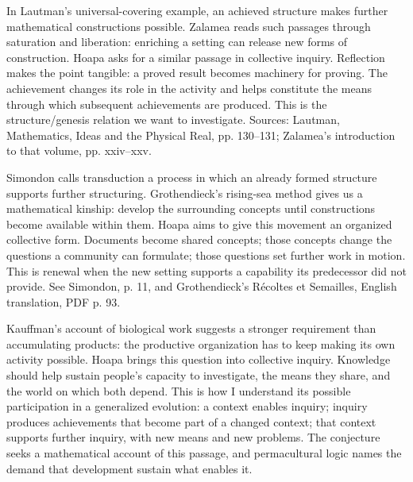\documentclass[a4paper,14pt]{extarticle}
\newcommand{\guidegroup}[1]{\par\addvspace{10pt}\needspace{4\baselineskip}{\bfseries #1\par}\nopagebreak}
\begin{document}
\guidegroup{\color{reflectionviolet}Reflection}
\par\addvspace{6pt}In Lautman's universal-covering example, an achieved structure makes further mathematical constructions possible. Zalamea reads such passages through saturation and liberation: enriching a setting can release new forms of construction. Hoapa asks for a similar passage in collective inquiry. Reflection makes the point tangible: a proved result becomes machinery for proving. The achievement changes its role in the activity and helps constitute the means through which subsequent achievements are produced. This is the structure/genesis relation we want to investigate. Sources: Lautman, Mathematics, Ideas and the Physical Real, pp. 130–131; Zalamea's introduction to that volume, pp. xxiv–xxv.\par
\guidegroup{\color{emergencecoral}Renewal}
\par\addvspace{6pt}Simondon calls transduction a process in which an already formed structure supports further structuring. Grothendieck's rising-sea method gives us a mathematical kinship: develop the surrounding concepts until constructions become available within them. Hoapa aims to give this movement an organized collective form. Documents become shared concepts; those concepts change the questions a community can formulate; those questions set further work in motion. This is renewal when the new setting supports a capability its predecessor did not provide. See Simondon, p. 11, and Grothendieck's Récoltes et Semailles, English translation, PDF p. 93.\par
\guidegroup{\color{permaculturegreen}Conditions of activity}
\par\addvspace{6pt}Kauffman's account of biological work suggests a stronger requirement than accumulating products: the productive organization has to keep making its own activity possible. Hoapa brings this question into collective inquiry. Knowledge should help sustain people's capacity to investigate, the means they share, and the world on which both depend. This is how I understand its possible participation in a generalized evolution: a context enables inquiry; inquiry produces achievements that become part of a changed context; that context supports further inquiry, with new means and new problems. The conjecture seeks a mathematical account of this passage, and permacultural logic names the demand that development sustain what enables it.\par
\end{document}
